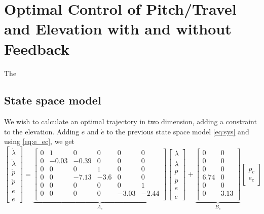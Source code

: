 \section{Optimal Control of Pitch/Travel and Elevation with and without Feedback}\label{sec:prob4}
\label{text:problem4}

The 

\subsection{State space model}
We wish to calculate an optimal trajectory in two dimension, adding a constraint to the elevation. Adding $e$ and $\dot{e}$ to the previous state space model \eqref{eq:sys} and using \eqref{eq:e_ec}, we get
\begin{equation}
	\begin{bmatrix}
		\dot{\lambda}\\
		\ddot{\lambda}	\\
		\dot{p}	\\
		\ddot{p}\\
		\dot{e}	\\
		\ddot{e}
	\end{bmatrix} = 
	\underbrace{
	\begin{bmatrix}
		0 & 1 & 0 & 0 & 0  & 0 \\
		0 & -0.03 & -0.39 & 0 & 0 & 0 \\
		0 & 0 & 0 & 1 & 0 & 0 \\
		0 & 0 & -7.13 & -3.6 & 0 & 0 \\
		0 & 0 & 0 & 0 & 0 & 1 \\
		0 & 0 & 0 & 0 & -3.03 & -2.44 \\
	\end{bmatrix}}_{A_c}
	\begin{bmatrix}
		\lambda	\\
		\dot{\lambda}\\
		p		\\
		\dot{p} \\
		e		\\
		\dot{e}
	\end{bmatrix} +
	\underbrace{
	\begin{bmatrix}
		0 & 0\\
		0 & 0\\
		0 & 0\\
		6.74 & 0\\
		0 & 0 \\
		0 & 3.13 \\
	\end{bmatrix}}_{B_c}
	\begin{bmatrix}
	p_c \\
	e_c
	\end{bmatrix}
	\label{eq:ex_sys}
\end{equation}

